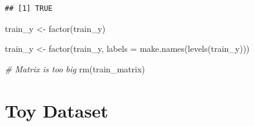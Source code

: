 \documentclass[
]{article}
\newenvironment{Shaded}{\begin{snugshade}}{\end{snugshade}}
\newcommand{\AttributeTok}[1]{\textcolor[rgb]{0.77,0.63,0.00}{#1}}
\newcommand{\CommentTok}[1]{\textcolor[rgb]{0.56,0.35,0.01}{\textit{#1}}}
\newcommand{\FunctionTok}[1]{\textcolor[rgb]{0.00,0.00,0.00}{#1}}
\newcommand{\NormalTok}[1]{#1}
\newcommand{\OtherTok}[1]{\textcolor[rgb]{0.56,0.35,0.01}{#1}}
\begin{document}
\begin{verbatim}
## [1] TRUE
\end{verbatim}

\begin{Shaded}
\begin{Highlighting}[]
\NormalTok{train\_y }\OtherTok{\textless{}{-}} \FunctionTok{factor}\NormalTok{(train\_y)}

\NormalTok{train\_y }\OtherTok{\textless{}{-}} \FunctionTok{factor}\NormalTok{(train\_y, }\AttributeTok{labels =} \FunctionTok{make.names}\NormalTok{(}\FunctionTok{levels}\NormalTok{(train\_y)))}

\CommentTok{\# Matrix is too big}
\FunctionTok{rm}\NormalTok{(train\_matrix)}
\end{Highlighting}
\end{Shaded}

\hypertarget{toy-dataset}{%
\section{Toy Dataset}\label{toy-dataset}}
\end{document}
